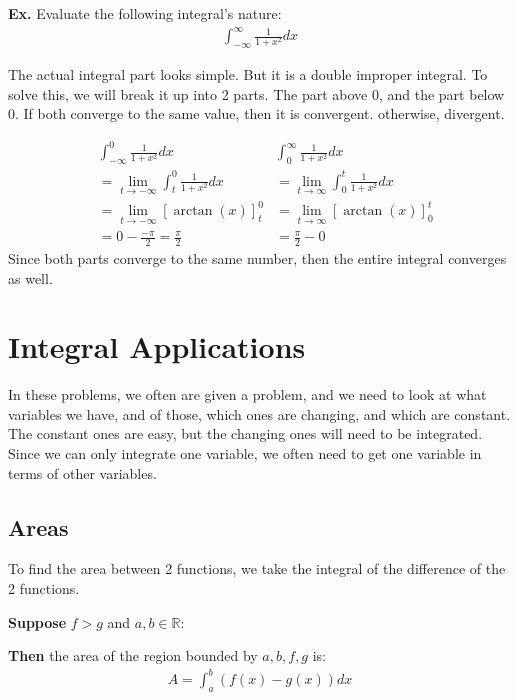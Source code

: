\documentclass[12pt,letterpaper]{article} \usepackage{amsmath} \usepackage{graphicx}  \usepackage{longtable}  \usepackage{amssymb}
\begin{document}
    \begin{mdframed}
        \textbf{Ex. } Evaluate the following integral's nature:
        \begin{align*}
            \int^{\infty}_ {-\infty} \frac{1}{1+x^2} dx
        \end{align*}
        
        The actual integral part looks simple. But it is a double improper integral. To solve this, we will break it up into 2 parts. The part above 0, and the part below 0. If both converge to the same value, then it is convergent. otherwise, divergent.

        \begin{align*}
            & \int^0_{-\infty} \frac{1}{1+x^2} dx & \int^{\infty}_0 \frac{1}{1+x^2} dx\\
            &=\lim_{t\to -\infty} \int^0_t \frac{1}{1+x^2} dx &= \lim_{t\to \infty} \int_0^t \frac{1}{1+x^2} dx\\
            &= \lim_{t\to -\infty} \left[\arctan(x)\right]_t^0 &= \lim_{t\to\infty} \left[\arctan(x)\right]^t_0\\
            &= 0 - \frac{-\pi}{2} = \frac{\pi}{2} &=\frac{\pi}{2}-0
        \end{align*}
        Since both parts converge to the same number, then the entire integral converges as well.
    \end{mdframed}

    \section{Integral Applications}
    In these problems, we often are given a problem, and we need to look at what variables we have, and of those, which ones are changing, and which are constant. The constant ones are easy, but the changing ones will need to be integrated. Since we can only integrate one variable, we often need to get one variable in terms of other variables. 

        \subsection{Areas}
        To find the area between 2 functions, we take the integral of the difference of the 2 functions.

        \textbf{Suppose} $f>g$ and $a,b\in\mathbb{R}$:
        
        \textbf{Then} the area of the region bounded by $a, b, f, g$ is:
        \begin{align*}
            A = \int ^b_a \left(f(x)-g(x)\right)dx
        \end{align*}
\end{document}
